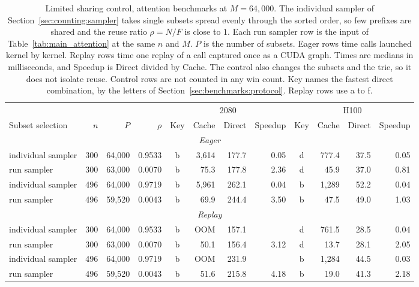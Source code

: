 \begin{table}[!htbp]
\caption{Limited sharing control, attention benchmarks at $M = 64{,}000$. The individual sampler of Section~\ref{sec:counting:sampler} takes single subsets spread evenly through the sorted order, so few prefixes are shared and the reuse ratio $\rho = N / F$ is close to $1$. Each run sampler row is the input of Table~\ref{tab:main_attention} at the same $n$ and $M$. $P$ is the number of subsets. Eager rows time calls launched kernel by kernel. Replay rows time one replay of a call captured once as a CUDA graph. Times are medians in milliseconds, and Speedup is Direct divided by Cache. The control also changes the subsets and the trie, so it does not isolate reuse. Control rows are not counted in any win count. Key names the fastest direct combination, by the letters of Section~\ref{sec:benchmarks:protocol}. Replay rows use a to f.}
\label{tab:control}
\footnotesize
\setlength{\tabcolsep}{2.5pt}
\begin{tabular}{lrrr crrr crrr}
\toprule
 &  &  &  & \multicolumn{4}{c}{2080} & \multicolumn{4}{c}{H100} \\
\cmidrule(lr){5-8} \cmidrule(lr){9-12}
Subset selection & $n$ & $P$ & $\rho$ & Key & Cache & Direct & Speedup & Key & Cache & Direct & Speedup \\
\midrule
\multicolumn{12}{c}{\textit{Eager}} \\
individual sampler & 300 & 64,000 & 0.9533 & b & 3,614 & 177.7 & 0.05 & d & 777.4 & 37.5 & 0.05 \\
run sampler & 300 & 63,000 & 0.0070 & b & 75.3 & 177.8 & 2.36 & d & 45.9 & 37.0 & 0.81 \\
\addlinespace
individual sampler & 496 & 64,000 & 0.9719 & b & 5,961 & 262.1 & 0.04 & b & 1,289 & 52.2 & 0.04 \\
run sampler & 496 & 59,520 & 0.0043 & b & 69.9 & 244.4 & 3.50 & b & 47.5 & 49.0 & 1.03 \\
\midrule
\multicolumn{12}{c}{\textit{Replay}} \\
individual sampler & 300 & 64,000 & 0.9533 & b & OOM & 157.1 &  & d & 761.5 & 28.5 & 0.04 \\
run sampler & 300 & 63,000 & 0.0070 & b & 50.1 & 156.4 & 3.12 & d & 13.7 & 28.1 & 2.05 \\
\addlinespace
individual sampler & 496 & 64,000 & 0.9719 & b & OOM & 231.9 &  & b & 1,284 & 44.5 & 0.03 \\
run sampler & 496 & 59,520 & 0.0043 & b & 51.6 & 215.8 & 4.18 & b & 19.0 & 41.3 & 2.18 \\
\bottomrule
\end{tabular}
\end{table}